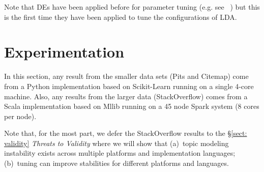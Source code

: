 \documentclass[10pt,conference]{IEEEtran}
\theoremstyle{break}
\begin{document}
Note that DEs have been
applied before for parameter tuning (e.g. see~\cite{omran2005differential,
  chiha2012tuning, fu2016tuning} ) but this is the first time they have been
applied to tune the configurations of LDA.

\section{Experimentation}


In this section,
 any result
from the smaller data sets (Pits and Citemap) come
from a Python implementation based on Scikit-Learn running on a single 4-core machine.
Also,
  any results from the larger data (StackOverflow) comes from a Scala implementation
  based on Mllib running on a 45 node Spark system (8 cores per node).
  
  Note that, for the most part, we defer the StackOverflow results to the \S\ref{sect: validity} {\em Threats to Validity} where we will show that (a)~topic modeling instability
  exists across multiple platforms and  implementation languages; (b)~tuning
  can improve stabilities for different platforms and languages.

  
\end{document}
